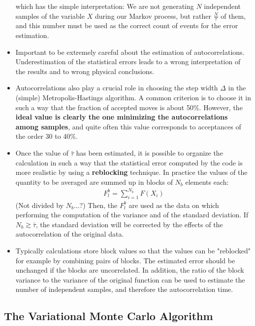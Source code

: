 \documentclass[twoside,english]{uiofysmaster}
\begin{document}
\begin{itemize}
	which has the simple interpretation: We are not generating $N$ independent samples of the variable $X$ during our Markov process, but rather $\frac{N}{\bar{\tau}}$ of them, and this number must be used as the correct count of events for the error estimation. 
	\item Important to be extremely careful about the estimation of autocorrelations. Underestimation of the statistical errors leads to a wrong interpretation of the results and to wrong physical conclusions.
	\item Autocorrelations also play a crucial role in choosing the step width $\Delta$ in the (simple) Metropolis-Hastings algorithm. A common criterion is to choose it in such a way that the fraction of accepted moves is about 50\%. However, the \textbf{ideal value is clearly the one minimizing the autocorrelations among samples}, and quite often this value corresponds to acceptances of the order 30 to 40\%. 
	\item Once the value of $\bar{\tau}$ has been estimated, it is possible to organize the calculation in such a way that the statistical error computed by the code is more realistic by using a \textbf{reblocking} technique. In practice the values of the quantity to be averaged are summed up in blocks of $N_b$ elements each:
	\begin{align}
		F_l^b = \sum_{i=1}^{N_b} F(X_i)
	\end{align}
	(Not divided by $N_b$...?) Then, the $F_l^b$ are used as the data on which performing the computation of the variance and of the standard deviation. If $N_b \gtrsim \bar{\tau}$, the standard deviation will be corrected by the effects of the autocorrelation of the original data. 
	\item Typically calculations store block values so that the values can be "reblocked" for example by combining pairs of blocks. The estimated error should be unchanged if the blocks are uncorrelated. In addition, the ratio of the block variance to the variance of the original function can be used to estimate the number of independent samples, and therefore the autocorrelation time.
\end{itemize}



\subsection{The Variational Monte Carlo Algorithm}
\end{document}
